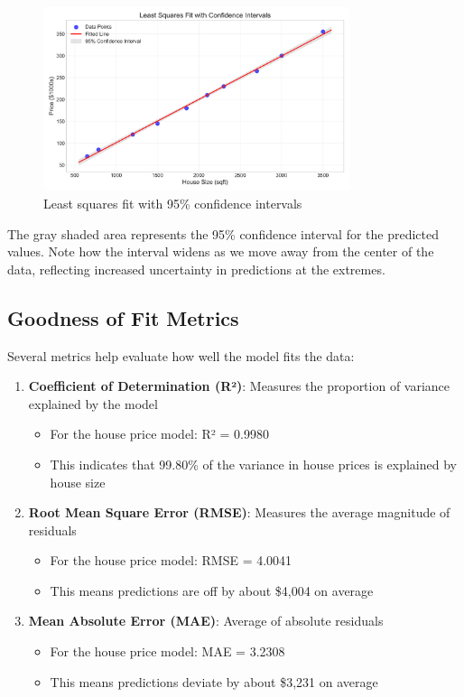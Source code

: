 \documentclass[12pt]{article}
\begin{document}
\begin{figure}[H]
\centering
\includegraphics[width=0.8\textwidth]{confidence_intervals.png}
\caption{Least squares fit with 95\% confidence intervals}
\label{fig:confidence_intervals}
\end{figure}

The gray shaded area represents the 95\% confidence interval for the predicted values. Note how the interval widens as we move away from the center of the data, reflecting increased uncertainty in predictions at the extremes.

\subsection{Goodness of Fit Metrics}

Several metrics help evaluate how well the model fits the data:

\begin{enumerate}
    \item \textbf{Coefficient of Determination (R²)}: Measures the proportion of variance explained by the model
    \begin{itemize}
        \item For the house price model: R² = 0.9980
        \item This indicates that 99.80\% of the variance in house prices is explained by house size
    \end{itemize}

    \item \textbf{Root Mean Square Error (RMSE)}: Measures the average magnitude of residuals
    \begin{itemize}
        \item For the house price model: RMSE = 4.0041
        \item This means predictions are off by about \$4,004 on average
    \end{itemize}

    \item \textbf{Mean Absolute Error (MAE)}: Average of absolute residuals
    \begin{itemize}
        \item For the house price model: MAE = 3.2308
        \item This means predictions deviate by about \$3,231 on average
    \end{itemize}
\end{enumerate}
\end{document}
